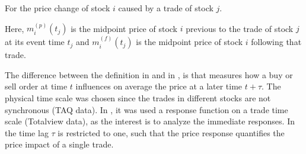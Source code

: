 For the price change of stock $i$ caused by a trade of stock $j$.

Here, $m_{i}^{\left(p\right)}\left(t_{j}\right)$ is the midpoint price of stock
$i$ previous to the trade of stock $j$ at its event time $t_j$ and
$m_{i}^{\left(f\right)}\left(t_{j}\right)$ is the midpoint price of stock $i$
following that trade.

The difference between the definition in \cite{Wang_2016_cross} and in
\cite{Wang_2018_b}, is that \cite{Wang_2016_cross} measures how a buy or sell
order at time $t$ influences on average the price at a later time $t + \tau$.
The physical time scale was chosen since the trades in different stocks are not
synchronous (TAQ data). In \cite{Wang_2018_b}, it was used a response function
on a trade time scale (Totalview data), as the interest is to analyze the
immediate responses. In \cite{Wang_2018_b} the time lag $\tau$ is restricted to
one, such that the price response quantifies the price impact of a single
trade.
